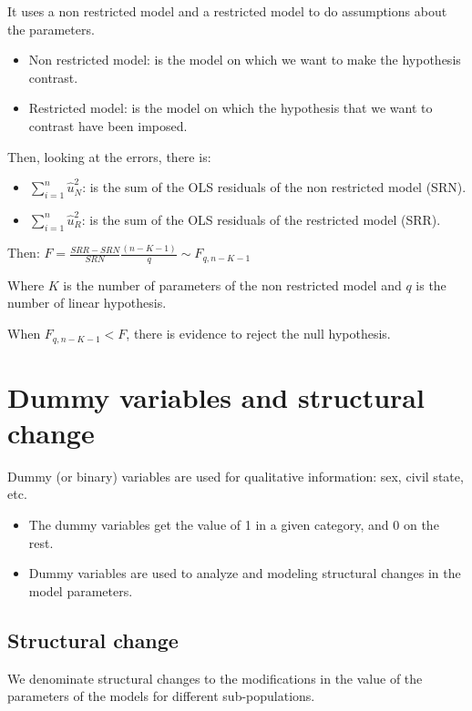 \documentclass[10pt,landscape]{article}
\begin{document}
\begin{multicols}{3}
It uses a non restricted model and a restricted model to do assumptions about the parameters.

\begin{itemize}[leftmargin=*]
\item Non restricted model: is the model on which we want to make the hypothesis contrast.
\item Restricted model: is the model on which the hypothesis that we want to contrast have been imposed.
\end{itemize}

Then, looking at the errors, there is:

\begin{itemize}[leftmargin=*]
\item $\sum_{i=1}^n \hat{u}_N^2$: is the sum of the OLS residuals of the non restricted model (SRN).
\item $\sum_{i=1}^n \hat{u}_R^2$: is the sum of the OLS residuals of the restricted model (SRR).
\end{itemize}

Then: $F = \frac{SRR - SRN}{SRN} \frac{(n-K-1)}{q} \sim F_{q, n-K-1}$

Where $K$ is the number of parameters of the non restricted model and $q$ is the number of linear hypothesis.

When $F_{q, n-K-1} < F$, there is evidence to reject the null hypothesis.

\section*{Dummy variables and structural change}

Dummy (or binary) variables are used for qualitative information: sex, civil state, etc.

\begin{itemize}[leftmargin=*]
\item The dummy variables get the value of 1 in a given category, and 0 on the rest.
\item Dummy variables are used to analyze and modeling structural changes in the model parameters.
\end{itemize}

\subsection*{Structural change}

We denominate structural changes to the modifications in the value of the parameters of the models for different sub-populations.


\end{multicols}
\end{document}
